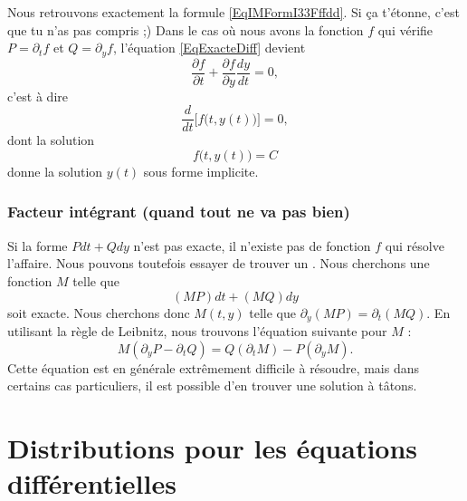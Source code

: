 Nous retrouvons exactement la formule \eqref{EqIMFormI33Fffdd}. Si ça t'étonne, c'est que tu n'as pas compris ;) Dans le cas où nous avons la fonction $f$ qui vérifie $P=\partial_tf$ et $Q=\partial_yf$, l'équation \eqref{EqExacteDiff} devient
\begin{equation}
	\frac{ \partial f }{ \partial t }+\frac{ \partial f }{ \partial y }\frac{ dy }{ dt }=0,
\end{equation}
c'est à dire
\begin{equation}
	\frac{ d }{ dt }\Big[ f\big( t,y(t) \big) \Big]=0,
\end{equation}
dont la solution
\begin{equation}
	f\big( t,y(t) \big)=C
\end{equation}
donne la solution $y(t)$ sous forme implicite.

					\subsubsection{Facteur intégrant (quand tout ne va pas bien)}

Si la forme $Pdt+Qdy$ n'est pas exacte, il n'existe pas de fonction $f$ qui résolve l'affaire. Nous pouvons toutefois essayer de trouver un . Nous cherchons une fonction $M$ telle que
\begin{equation}
	(MP)dt+(MQ)dy
\end{equation}
soit exacte. Nous cherchons donc $M(t,y)$ telle que $\partial_y(MP)=\partial_t(MQ)$. En utilisant la règle de Leibnitz, nous trouvons l'équation suivante pour $M$ :
\begin{equation}		\label{EqDuFacteurIntegrant}
	M(\partial_yP-\partial_tQ)=Q(\partial_tM)-P(\partial_yM).
\end{equation}
Cette équation est en générale extrêmement difficile à résoudre, mais dans certains cas particuliers, il est possible d'en trouver une solution à tâtons.

\section{Distributions pour les équations différentielles}
\label{SecTNgeNms}

